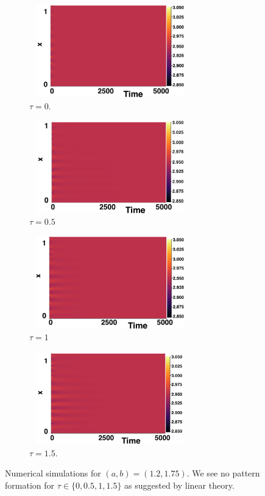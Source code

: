\begin{figure}[H]
    \centering
    \begin{subfigure}[b]{0.45\textwidth}
        \centering
        \includegraphics[width=7cm,height=4cm]{p3t0.png}
        \caption{$\tau=0$.}
        \label{}
    \end{subfigure}
    \hfill
    \begin{subfigure}[b]{0.45\textwidth}
        \centering
        \includegraphics[width=7cm,height=4cm]{p3t05.png}
        \caption{$\tau=0.5$}
        \label{}
    \end{subfigure}
    \hfill
    \begin{subfigure}[b]{0.45\textwidth}
        \centering
        \includegraphics[width=7cm,height=4cm]{p3t1.png}
        \caption{$\tau=1$}
        \label{}
    \end{subfigure}
    \hfill
    \begin{subfigure}[b]{0.45\textwidth}
        \centering
        \includegraphics[width=7cm,height=4cm]{p3t15.png}
        \caption{$\tau=1.5$.}
        \label{}
    \end{subfigure}
    \caption{Numerical simulations for $(a,b)=(1.2,1.75)$. We see no pattern formation for $\tau\in\{0,0.5,1,1.5\}$ as suggested by linear theory.}
    \label{fig:testturing2}
\end{figure}

